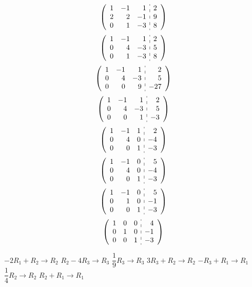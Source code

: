 \documentclass[11pt,letterpaper]{article}
\begin{document}
\sol \par
\begin{minipage}[t]{0.49\textwidth}
	\[
	\left(
	\begin{array}{rrr:r}
	1 & -1 & 1 & 2 \\
	2 & 2 & -1 & 9 \\
	0 & 1 & -3 & 8
	\end{array} 
	\right)
	\] 
	\[
	\left(
	\begin{array}{rrr:r}
	1 & -1 & 1 & 2 \\
	0 & 4 & -3 & 5 \\
	0 & 1 & -3 & 8
	\end{array} 
	\right)
	\] 
	\[
	\left(
	\begin{array}{rrr:r}
	1 & -1 & 1 & 2 \\
	0 & 4 & -3 & 5 \\
	0 & 0 & 9 & -27
	\end{array} 
	\right)
	\] 
	\[
	\left(
	\begin{array}{rrr:r}
	1 & -1 & 1 & 2 \\
	0 & 4 & -3 & 5 \\
	0 & 0 & 1 & -3
	\end{array} 
	\right)
	\] 
	\[
	\left(
	\begin{array}{rrr:r}
	1 & -1 & 1 & 2 \\
	0 & 4 & 0 & -4 \\
	0 & 0 & 1 & -3
	\end{array} 
	\right)
	\] 
	\[
	\left(
	\begin{array}{rrr:r}
	1 & -1 & 0 & 5 \\
	0 & 4 & 0 & -4 \\
	0 & 0 & 1 & -3
	\end{array} 
	\right)
	\] 
	\[
	\left(
	\begin{array}{rrr:r}
	1 & -1 & 0 & 5 \\
	0 & 1 & 0 & -1 \\
	0 & 0 & 1 & -3
	\end{array} 
	\right)
	\] 
	\[
	\left(
	\begin{array}{rrr:r}
	1 & 0 & 0 & 4 \\
	0 & 1 & 0 & -1 \\
	0 & 0 & 1 & -3
	\end{array} 
	\right)
	\] 
\end{minipage}%
\begin{minipage}[t]{0.49\textwidth}
\pvspace{0.6cm}
$-2R_1 + R_2 \to R_2$ \pvspace{1.2cm}
$R_2 - 4R_3 \to R_3$ \pvspace{1.2cm}
$\dfrac{1}{9}R_3 \to R_3$ \pvspace{1.2cm}
$3R_3 + R_2 \to R_2$ \pvspace{1.2cm}
$-R_3 + R_1 \to R_1$ \pvspace{1.2cm}
$\dfrac{1}{4}R_2 \to R_2$ \pvspace{1.2cm}
$R_2 + R_1 \to R_1$
\end{minipage} \pspace
\end{document}
